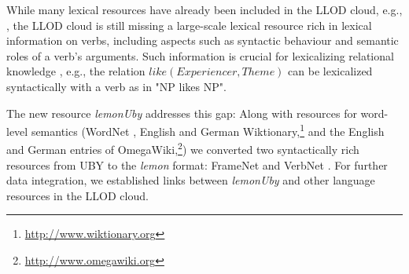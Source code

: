 %

While many lexical resources have already been included in the LLOD cloud, e.g.,
\cite{Bizer_Lehmann_Kobilarov_Auer_Becker_Cyganiak_Hellmann_2009, mccrae2012integrating, navigli2012babelnet, de2008language, deMeloWeikum2008c},
the LLOD cloud is still missing a
large-scale lexical resource rich in lexical information on
verbs, including aspects such as syntactic behaviour and 
semantic roles of a verb's arguments.
Such information is crucial for lexicalizing relational knowledge%
, e.g., the relation $like(Experiencer, Theme)$ can be lexicalized syntactically with a verb as in "NP likes NP".


The new resource \emph{le\-mon\-U\-by} addresses this gap: Along with resources for word-level semantics (WordNet \cite{fellbaum98-wordnet}, 
English and German Wiktionary,\footnote{\url{http://www.wiktionary.org}} and the English and German entries of 
Ome\-ga\-Wi\-ki,\footnote{\url{http://www.omegawiki.org}}) we converted two syntactically rich resources from
UBY to the \emph{lemon} format: FrameNet \cite{baker1998berkley} and VerbNet \cite{kipper2008large}. %
For further data integration, we established links between \emph{le\-mon\-U\-by} and other language resources in the LLOD cloud.

